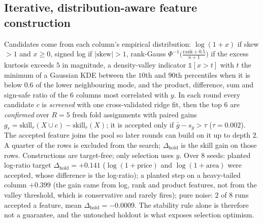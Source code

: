 \documentclass[conference]{IEEEtran}
\begin{document}
\subsection{Iterative, distribution-aware feature construction}
Candidates come from each column's empirical distribution: $\log(1+x)$ if skew $>1$ and $x\ge0$, signed log if $|\mathrm{skew}|>1$, rank-Gauss $\Phi^{-1}\!\big(\frac{\mathrm{rank}+0.5}{n+1}\big)$ if the excess kurtosis exceeds $5$ in magnitude, a density-valley indicator $\mathbb 1[x>t]$ with $t$ the minimum of a Gaussian KDE between the $10$th and $90$th percentiles when it is below $0.6$ of the lower neighbouring mode, and the product, difference, sum and sign-safe ratio of the $6$ columns most correlated with $y$. In each round every candidate $c$ is \emph{screened} with one cross-validated ridge fit, then the top $6$ are \emph{confirmed} over $R=5$ fresh fold assignments with paired gains $g_r=\mathrm{skill}_r(X\cup c)-\mathrm{skill}_r(X)$; it is accepted only if $\bar g-s_g>\tau$ ($\tau=0.002$). The accepted feature joins the pool so later rounds can build on it up to depth $2$. A quarter of the rows is excluded from the search; $\Delta_{\mathrm{hold}}$ is the skill gain on those rows. Constructions are target-free; only selection uses $y$. Over $8$ seeds: planted log-ratio target $\Delta_{\mathrm{hold}}=+0.141$ ($\log(1+\mathrm{price})$ and $\log(1+\mathrm{area})$ were accepted, whose difference is the log-ratio); a planted step on a heavy-tailed column $+0.399$ (the gain came from log, rank and product features, not from the valley threshold, which is conservative and rarely fires); pure noise: $2$ of $8$ runs accepted a feature, mean $\Delta_{\mathrm{hold}}=-0.0009$. The stability rule alone is therefore not a guarantee, and the untouched holdout is what exposes selection optimism.
\end{document}
